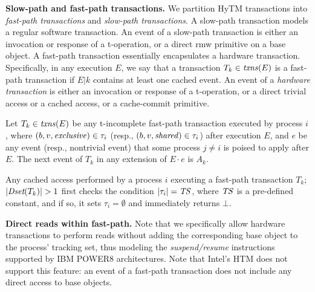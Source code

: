 \vspace{1mm}\noindent\textbf{Slow-path and fast-path transactions.}
We partition HyTM transactions into \emph{fast-path transactions} and \emph{slow-path transactions}.
A slow-path transaction models a regular software transaction.
An event of a slow-path transaction is either an invocation or response of a t-operation, or
a direct rmw primitive on a base object. 
A fast-path transaction essentially encapsulates a hardware transaction. Specifically, in any execution $E$,
we say that a transaction $T_k\in \ms{txns}(E)$ is a fast-path transaction if $E|k$ contains at least one cached event.
An event of a \emph{hardware transaction} is either an invocation or response of a t-operation, or
a direct trivial access or a cached access, or a cache-commit primitive.
%
\begin{remark}
\label{re:traborts}
%
Let $T_k \in \ms{txns}(E)$ be any t-incomplete fast-path transaction executed by process $i$, 
where $(b,v,\mathit{exclusive})\in\tau_i$ (resp., $(b,v,\mathit{shared})\in\tau_i$) after execution $E$, and $e$ be any event (resp., nontrivial event) 
that some process $j\neq i$ is poised to apply after $E$.
The next event of $T_k$ in any extension of $E\cdot e$ is $A_k$.
%
\end{remark}
%
%
\begin{remark}
\label{re:capacity}
Any cached access performed by a process $i$ executing a fast-path 
transaction $T_k$; $|\Dset(T_k)|>1$ first checks the condition $|\tau_i|=\mathit{TS}$, where $\mathit{TS}$ is a pre-defined constant, and if so, it
sets $\tau_i=\emptyset$ and immediately returns $\bot$. 
\end{remark}

\vspace{1mm}\noindent\textbf{Direct reads within fast-path.}
Note that we specifically allow hardware transactions to perform reads without adding the corresponding base object to
the process' tracking set, thus modeling the \emph{suspend/resume} instructions supported by 
IBM POWER8 architectures. Note that Intel's HTM does not support this feature: an event of a fast-path transaction
does not include any direct access to base objects.

